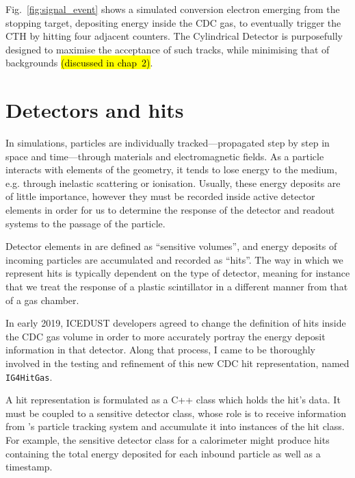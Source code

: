Fig.~\ref{fig:signal_event} shows a simulated conversion electron emerging from the stopping target, depositing energy inside the CDC gas, to eventually trigger the CTH by hitting four adjacent counters. 
The Cylindrical Detector is purposefully designed to maximise the acceptance of such tracks, while minimising that of backgrounds \hl{(discussed in chap~2)}.%

\section{Detectors and hits}\label{subsec:SD}
In \Geant simulations, particles are individually tracked---propagated step by step in space and time---through materials and electromagnetic fields. 
As a particle interacts with elements of the geometry, it tends to lose energy to the medium, e.g. through inelastic scattering or ionisation. 
Usually, these energy deposits are of little importance, however they must be recorded inside active detector elements in order for us to determine the response of the detector and readout systems to the passage of the particle.


Detector elements in \Geant are defined as ``sensitive volumes'', and energy deposits of incoming particles are accumulated and recorded as ``hits''. 
The way in which we represent hits is typically dependent on the type of detector, meaning for instance that we treat the response of a plastic scintillator in a different manner from that of a gas chamber. %

In early 2019, ICEDUST developers agreed to change the definition of hits inside the CDC gas volume in order to more accurately portray the energy deposit information in that detector. Along that process, I came to be thoroughly involved in the testing and refinement of this new CDC hit representation, named \texttt{IG4HitGas}. 

A hit representation is formulated as a C++ class which holds the hit's data. It must be coupled to a sensitive detector class, whose role is to receive information from \Geant's particle tracking system and accumulate it into instances of the hit class. For example, the sensitive detector class for a calorimeter might produce hits containing the total energy deposited for each inbound particle as well as a timestamp.

